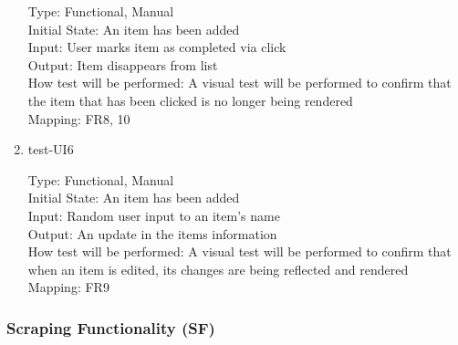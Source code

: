 \documentclass[12pt, titlepage]{article}
\begin{document}
\begin{enumerate}
Type: Functional, Manual\\
Initial State: An item has been added\\
Input: User marks item as completed via click\\
Output: Item disappears from list\\
How test will be performed: A visual test will be performed to confirm that the item that has been clicked is no longer being rendered\\
Mapping: FR8, 10

\item{test-UI6\\}

Type: Functional, Manual\\
Initial State: An item has been added\\
Input: Random user input to an item’s name\\
Output: An update in the items information\\
How test will be performed: A visual test will be performed to confirm that when an item is edited, its changes are being reflected and rendered\\
Mapping: FR9

\end{enumerate}

\color{red}
\subsubsection{Scraping Functionality (SF)}
\end{document}
